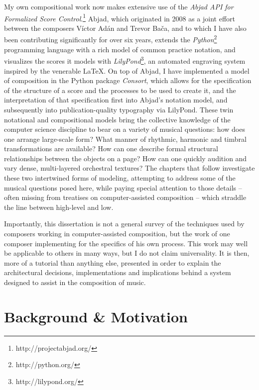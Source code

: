 My own compositional work now makes extensive use of the \emph{Abjad API for
Formalized Score Control}.\cite{baca2011xi, baca2015tenor,
trevino2013compositional}\footnote{http://projectabjad.org/} Abjad, which
originated in 2008 as a joint effort between the composers V\'{i}ctor Ad\'{a}n
and Trevor Ba\v{c}a, and to which I have also been contributing significantly
for over six years, extends the
\emph{Python}\cite{vanrossum2003ys}\footnote{http://python.org/} programming
language with a rich model of common practice notation, and visualizes the
scores it models with
\emph{LilyPond}\cite{nienhuys2003ve}\footnote{http://lilypond.org/}, an
automated engraving system inspired by the venerable \LaTeX{}. On top of Abjad,
I have implemented a model of composition in the Python package \emph{Consort},
which allows for the specification of the structure of a score and the
processes to be used to create it, and the interpretation of that specification
first into Abjad's notation model, and subsequently into publication-quality
typography via LilyPond. These twin notational and compositional models bring
the collective knowledge of the computer science discipline to bear on a
variety of musical questions: how does one arrange large-scale form? What
manner of rhythmic, harmonic and timbral transformations are available? How can
one describe formal structural relationships between the objects on a page? How
can one quickly audition and vary dense, multi-layered orchestral textures? The
chapters that follow investigate these two intertwined forms of modeling,
attempting to address some of the musical questions posed here, while paying
special attention to those details -- often missing from treatises on
computer-assisted composition -- which straddle the line between high-level and
low.

Importantly, this dissertation is not a general survey of the techniques used
by composers working in computer-assisted composition, but the work of one
composer implementing for the specifics of his own process. This work may well
be applicable to others in many ways, but I do not claim universality. It is
then, more of a tutorial than anything else, presented in order to explain the
architectural decisions, implementations and implications behind a system
designed to assist in the composition of music.

\section{Background \& Motivation}
\label{sec:background-and-motivation}

